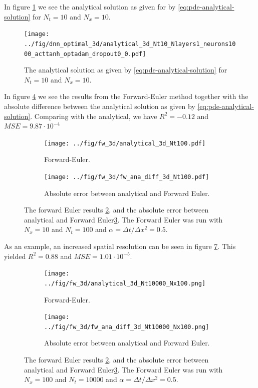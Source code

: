 In figure \ref{fig:analytical-solution} we see the analytical solution as given for by \eqref{eq:pde-analytical-solution} for $N_t=10$ and $N_x=10$.
\begin{figure}[h!tb]
    \centering
    \texttt{[image: ../fig/dnn\_optimal\_3d/analytical\_3d\_Nt10\_Nlayers1\_neurons1000\_acttanh\_optadam\_dropout0\_0.pdf]}
    \caption{The analytical solution as given by \eqref{eq:pde-analytical-solution} for $N_t=10$ and $N_x=10$.}
    \label{fig:analytical-solution}
\end{figure}

In figure \ref{fig:3d-fw-comparison-plots} we see the results from the Forward-Euler method together with the absolute difference between the analytical solution as given by \eqref{eq:pde-analytical-solution}. Comparing with the analytical, we have $R^2=-0.12$ and $MSE=9.87\cdot 10^{-4}$
\begin{figure}[h!tb]
    \centering
    \begin{subfigure}{0.5\textwidth}
        \centering
        \texttt{[image: ../fig/fw\_3d/analytical\_3d\_Nt100.pdf]}
        \caption{Forward-Euler.}
        \label{fig:fw-3d}
    \end{subfigure}
    \begin{subfigure}{0.5\textwidth}
        \centering
        \texttt{[image: ../fig/fw\_3d/fw\_ana\_diff\_3d\_Nt100.pdf]}
        \caption{Absolute error between analytical and Forward Euler.}
        \label{fig:fw-ana-diff-3d}
    \end{subfigure}
    \caption{The forward Euler results \ref{fig:fw-3d}, and the absolute error between analytical and Forward Euler\ref{fig:fw-ana-diff-3d}. The Forward Euler was run with $N_x=10$ and $N_t=100$ and $\alpha=\Delta t / \Delta x^2=0.5$.}
    \label{fig:3d-fw-comparison-plots}
\end{figure}

As an example, an increased spatial resolution can be seen in figure \ref{fig:3d-fw-comparison-plots-spatial-highres}. This yielded $R^2=0.88$ and $MSE=1.01\cdot 10^{-5}$.
\begin{figure}[h!tb]
    \centering
    \begin{subfigure}{0.5\textwidth}
        \centering
        \texttt{[image: ../fig/fw\_3d/analytical\_3d\_Nt10000\_Nx100.png]}
        \caption{Forward-Euler.}
        \label{fig:fw-3d-highres}
    \end{subfigure}
    \begin{subfigure}{0.5\textwidth}
        \centering
        \texttt{[image: ../fig/fw\_3d/fw\_ana\_diff\_3d\_Nt10000\_Nx100.png]}
        \caption{Absolute error between analytical and Forward Euler.}
        \label{fig:fw-ana-diff-3d-highres}
    \end{subfigure}
    \caption{The forward Euler results \ref{fig:fw-3d}, and the absolute error between analytical and Forward Euler\ref{fig:fw-ana-diff-3d}. The Forward Euler was run with $N_x=100$ and $N_t=10000$ and $\alpha=\Delta t / \Delta x^2=0.5$.}
    \label{fig:3d-fw-comparison-plots-spatial-highres}
\end{figure}


